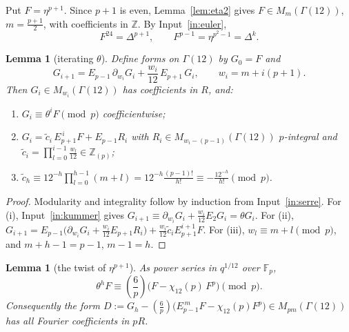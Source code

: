 \documentclass[11pt,a4paper]{article}
\numberwithin{equation}{section}
\newtheorem{lemma}[theorem]{Lemma}
\theoremstyle{definition}
\theoremstyle{remark}
\newcommand{\Fp}{\mathbb F_p}
\newcommand{\Z}{\mathbb Z}
\newcommand{\Lp}[1]{\left(\frac{#1}{p}\right)}
\begin{document}
Put $F=\eta^{p+1}$. Since $p+1$ is even, Lemma~\ref{lem:eta2} gives
$F\in M_m(\Gamma(12))$, $m=\frac{p+1}2$, with coefficients in $\Z$. By Input~\ref{in:euler},
\begin{equation}\label{eq:Fpowers}
F^{24}=\Delta^{p+1},\qquad F^{p-1}=\eta^{p^2-1}=\Delta^{k}.
\end{equation}

\begin{lemma}[iterating $\theta$]\label{lem:iter}
Define forms on $\Gamma(12)$ by $G_0=F$ and
\[
G_{i+1}=E_{p-1}\,\partial_{w_i}G_i+\frac{w_i}{12}\,E_{p+1}\,G_i,\qquad w_i=m+i(p+1).
\]
Then $G_i\in M_{w_i}(\Gamma(12))$ has coefficients in $R$, and:
\begin{enumerate}[label=\textup{(\roman*)}]
\item $G_i\equiv\theta^iF\pmod p$ coefficientwise;
\item $G_i=\tilde c_i\,E_{p+1}^{\,i}F+E_{p-1}R_i$ with $R_i\in M_{w_i-(p-1)}(\Gamma(12))$
$p$-integral and $\tilde c_i=\prod_{l=0}^{i-1}\frac{w_l}{12}\in\Z_{(p)}$;
\item $\tilde c_h\equiv12^{-h}\prod_{l=0}^{h-1}(m+l)=12^{-h}\frac{(p-1)!}{h!}\equiv-\frac{12^{-h}}{h!}\pmod p$.
\end{enumerate}
\end{lemma}

\begin{proof}
Modularity and integrality follow by induction from Input~\ref{in:serre}. For (i),
Input~\ref{in:kummer} gives
$G_{i+1}\equiv\partial_{w_i}G_i+\frac{w_i}{12}E_2G_i=\theta G_i$. For (ii),
$G_{i+1}=E_{p-1}\bigl(\partial_{w_i}G_i+\frac{w_i}{12}E_{p+1}R_i\bigr)+\frac{w_i}{12}\tilde c_iE_{p+1}^{i+1}F$.
For (iii), $w_l\equiv m+l\pmod p$, and $m+h-1=p-1$, $m-1=h$.
\end{proof}

\begin{lemma}[the twist of $\eta^{p+1}$]\label{lem:twist}
As power series in $q^{1/12}$ over $\Fp$,
\[
\theta^{h}F\equiv\Lp6\bigl(F-\chi_{12}(p)\,F^p\bigr)\pmod p .
\]
Consequently the form
$D:=G_h-\Lp6\bigl(E_{p-1}^{\,m}F-\chi_{12}(p)F^p\bigr)\in M_{pm}(\Gamma(12))$ has all Fourier
coefficients in $pR$.
\end{lemma}
\end{document}
